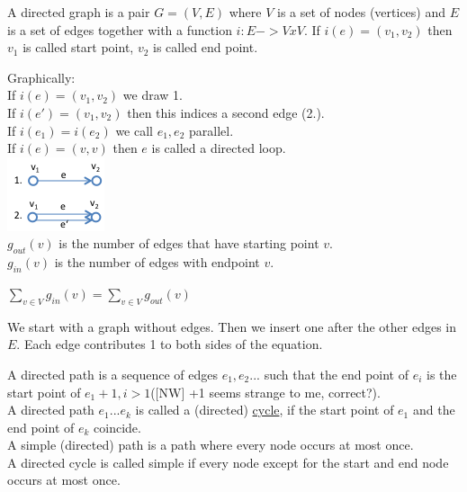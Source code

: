 \begin{definition}
    A directed graph is a pair $G = (V,E)$ where $V$ is a set of nodes (vertices) and $E$ is a set of edges together 
    with a function $i: E -> V x V$. If $i(e) = (v_{1},v_{2})$ then $v_{1}$ is called start point, $v_{2}$ is called end point.
\end{definition}
Graphically: \\[3mm]
If $i(e) = (v_{1},v_{2})$ we draw 1. \\
If $i(e') = (v_{1},v_{2})$ then this indices a second edge (2.). \\
If $i(e_{1}) = i(e_{2})$ we call $e_{1},e_{2}$ parallel. \\
If $i(e) = (v,v)$ then $e$ is called a directed loop. \\
\includegraphics{diagrams/def15_directd_graph.png} \\
$g_{out}(v)$ is the number of edges that have starting point $v$. \\
$g_{in}(v)$ is the number of edges with endpoint $v$.

\begin{lemma}
    $\displaystyle\sum\limits_{v \in V} g_{in}(v) = \displaystyle\sum\limits_{v \in V} g_{out}(v)$
\end{lemma}

\begin{prooof}
    We start with a graph without edges. Then we insert one after the other edges in $E$. 
    Each edge contributes 1 to both sides of the equation.
\end{prooof}

\begin{definition}
    A directed path is a sequence of edges $e_{1},e_{2}...$ such that the end point of $e_{i}$ is the start point of
    $e_{1} +1, i > 1$([NW] +1 seems strange to me, correct?). \\[3mm]

    A directed path $e_{1}...e_{k}$ is called a (directed) \underline{cycle}, if the start point of $e_{1}$ and
    the end point of $e_{k}$ coincide. \\
    A simple (directed) path is a path where every node occurs at most once. \\
    A directed cycle is called simple if every node except for the start and end node occurs at most once.
\end{definition}

